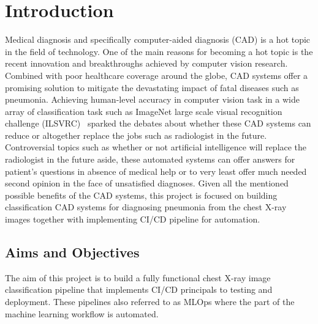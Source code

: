 \chapter{Introduction} \label{chap:introduction}

Medical diagnosis and specifically computer-aided diagnosis (CAD) is a hot topic in the field of technology. One of the main reasons for becoming a hot topic is the recent innovation and breakthroughs achieved by computer vision research. Combined with poor healthcare coverage around the globe, CAD systems offer a promising solution to mitigate the devastating impact of fatal diseases such as pneumonia. Achieving human-level accuracy in computer vision task in a wide array of classification task such as ImageNet large scale visual recognition challenge (ILSVRC)~\cite{imagenet} sparked the debates about whether these CAD systems can reduce or altogether replace the jobs such as radiologist in the future.
Controversial topics such as whether or not artificial intelligence will replace the radiologist in the future aside, these automated systems can offer answers for patient's questions in absence of medical help or to very least offer much needed second opinion in the face of unsatisfied diagnoses. Given all the mentioned possible benefits of the CAD systems, this project is focused on building classification CAD systems for diagnosing pneumonia from the chest X-ray images together with implementing CI/CD pipeline for automation.

\section{Aims and Objectives} \label{sec:aimsandobj}
The aim of this project is to build a fully functional chest X-ray image classification pipeline that implements CI/CD principals to testing and deployment.
These pipelines also referred to as MLOps where the part of the machine learning workflow is automated.

